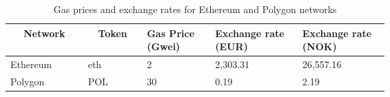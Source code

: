 \begin{table}
\centering
\caption{Gas prices and exchange rates for Ethereum and Polygon networks}
\label{tab:gasConversions}
\begin{tabular}{|p{0\linewidth}|p{0\linewidth}|p{0.185\linewidth}|p{0.23\linewidth}|p{0.23\linewidth}|}
\hline
\multicolumn{1}{|c|}{\textbf{Network}} & \multicolumn{1}{|c|}{\textbf{Token}} & \textbf{Gas Price (Gwei)} & \textbf{Exchange rate (EUR)} & \textbf{Exchange rate (NOK)} \\
\hline
Ethereum & \gls{eth} & 2 & 2,303.31 & 26,557.16 \\
\hline
Polygon & POL & 30 & 0.19 & 2.19 \\
\hline
\end{tabular}
\end{table}
